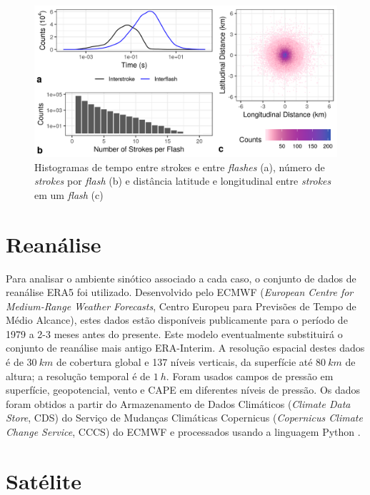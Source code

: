 \begin{figure}[htb]
	\begin{center}
		\caption{Histogramas de tempo entre strokes e entre \textit{flashes} (a), número de \textit{strokes} por \textit{flash} (b) e distância latitude e longitudinal entre \textit{strokes} em um \textit{flash} (c)} 
		\label{flash_stats}
		\includegraphics[width=\columnwidth]{../Lightning_Processing/figures/brasildat_flash_stats.png}
	\end{center}
\end{figure}

\section{Reanálise} \label{era5}

Para analisar o ambiente sinótico associado a cada caso, o conjunto de dados de reanálise ERA5 \cite{Copernicus2017} foi utilizado. Desenvolvido pelo ECMWF (\textit{European Centre for Medium-Range Weather Forecasts}, Centro Europeu para Previsões de Tempo de Médio Alcance), estes dados estão disponíveis publicamente para o período de 1979 a 2-3 meses antes do presente. Este modelo eventualmente substituirá o conjunto de reanálise mais antigo ERA-Interim. A resolução espacial destes dados é de $30\:km$ de cobertura global e 137 níveis verticais, da superfície até $80\:km$ de altura; a resolução temporal é de $1\:h$. Foram usados campos de pressão em superfície, geopotencial, vento e CAPE em diferentes níveis de pressão. Os dados foram obtidos a partir do Armazenamento de Dados Climáticos (\textit{Climate Data Store}, CDS) do Serviço de Mudanças Climáticas Copernicus (\textit{Copernicus Climate Change Service}, CCCS) do ECMWF e processados usando a linguagem Python \cite{Python2018}.

\section{Satélite} \label{goes16}

